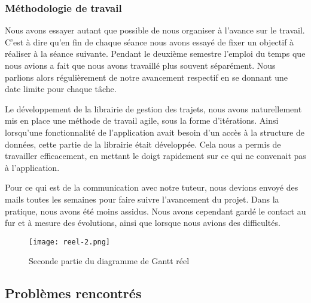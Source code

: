 \subsubsection{Méthodologie de travail}
Nous avons essayer autant que possible de nous organiser à l'avance sur le travail. C'est à dire qu'en fin de chaque séance nous avons essayé de fixer un objectif à réaliser à la séance suivante.
Pendant le deuxième semestre l'emploi du temps que nous avions a fait que nous avons travaillé plus souvent séparément. Nous parlions alors régulièrement de notre avancement respectif en se donnant une date limite pour chaque tâche.
\par
Le développement de la librairie de gestion des trajets, nous avons naturellement mis en place une méthode de travail agile, sous la forme d'itérations. Ainsi lorsqu'une fonctionnalité de l'application avait besoin d'un accès à la structure de données, cette partie de la librairie était développée.
Cela nous a permis de travailler efficacement, en mettant le doigt rapidement sur ce qui ne convenait pas à l'application.
\par
Pour ce qui est de la communication avec notre tuteur, nous devions envoyé des mails toutes les semaines pour faire suivre l'avancement du projet. Dans la pratique, nous avons été moins assidus. Nous avons cependant gardé le contact au fur et à mesure des évolutions, ainsi que lorsque nous avions des difficultés.
\vfill
\begin{figure}[!h]
    \begin{center}
        \texttt{[image: reel-2.png]}
        \caption{Seconde partie du diagramme de Gantt réel}
    \end{center}
\end{figure}
\newpage




\subsection{Problèmes rencontrés}

